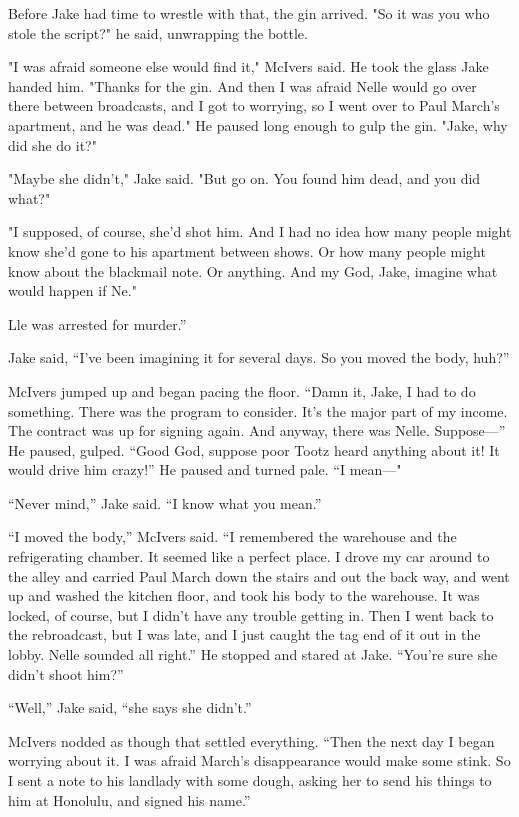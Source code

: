 \documentclass{novel}
\begin{document}
Before Jake had time to wrestle with that, the gin arrived. "So it was you who stole the script?" he said, unwrapping the bottle.

"I was afraid someone else would find it," McIvers said. He took the glass Jake handed him. "Thanks for the gin. And then I was afraid Nelle would go over there between broadcasts, and I got to worrying, so I went over to Paul March's apartment, and he was dead." He paused long enough to gulp the gin. "Jake, why did she do it?"

"Maybe she didn't," Jake said. "But go on. You found him dead, and you did what?"

"I supposed, of course, she'd shot him. And I had no idea how many people might know she'd gone to his apartment between shows. Or how many people might know about the blackmail note. Or anything. And my God, Jake, imagine what would happen if Ne."

Lle was arrested for murder.”

Jake said, “I’ve been imagining it for several days. So you moved the body, huh?”

McIvers jumped up and began pacing the floor. “Damn it, Jake, I had to do something. There was the program to consider. It’s the major part of my income. The contract was up for signing again. And anyway, there was Nelle. Suppose—” He paused, gulped. “Good God, suppose poor Tootz heard anything about it! It would drive him crazy!” He paused and turned pale. “I mean—"

“Never mind,” Jake said. “I know what you mean.”

“I moved the body,” McIvers said. “I remembered the warehouse and the refrigerating chamber. It seemed like a perfect place. I drove my car around to the alley and carried Paul March down the stairs and out the back way, and went up and washed the kitchen floor, and took his body to the warehouse. It was locked, of course, but I didn’t have any trouble getting in. Then I went back to the rebroadcast, but I was late, and I just caught the tag end of it out in the lobby. Nelle sounded all right.” He stopped and stared at Jake. “You’re sure she didn’t shoot him?”

“Well,” Jake said, “she says she didn’t.”

McIvers nodded as though that settled everything. “Then the next day I began worrying about it. I was afraid March’s disappearance would make some stink. So I sent a note to his landlady with some dough, asking her to send his things to him at Honolulu, and signed his name.”
\end{document}
